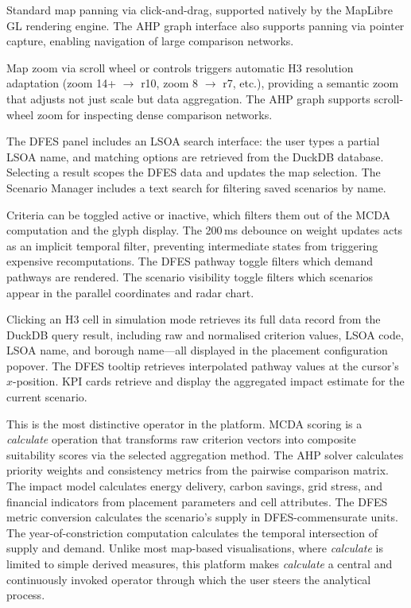 \begin{description}[nosep, leftmargin=0pt, itemindent=0pt]
    \item[Pan.] Standard map panning via click-and-drag, supported natively by the MapLibre GL rendering engine. The AHP graph interface also supports panning via pointer capture, enabling navigation of large comparison networks.

    \item[Zoom.] Map zoom via scroll wheel or controls triggers automatic H3 resolution adaptation (zoom 14+ $\rightarrow$ r10, zoom 8 $\rightarrow$ r7, etc.), providing a semantic zoom that adjusts not just scale but data aggregation. The AHP graph supports scroll-wheel zoom for inspecting dense comparison networks.

    \item[Search.] The DFES panel includes an LSOA search interface: the user types a partial LSOA name, and matching options are retrieved from the DuckDB database. Selecting a result scopes the DFES data and updates the map selection. The Scenario Manager includes a text search for filtering saved scenarios by name.

    \item[Filter.] Criteria can be toggled active or inactive, which filters them out of the MCDA computation and the glyph display. The 200\,ms debounce on weight updates acts as an implicit temporal filter, preventing intermediate states from triggering expensive recomputations. The DFES pathway toggle filters which demand pathways are rendered. The scenario visibility toggle filters which scenarios appear in the parallel coordinates and radar chart.

    \item[Retrieve.] Clicking an H3 cell in simulation mode retrieves its full data record from the DuckDB query result, including raw and normalised criterion values, LSOA code, LSOA name, and borough name—all displayed in the placement configuration popover. The DFES tooltip retrieves interpolated pathway values at the cursor's $x$-position. KPI cards retrieve and display the aggregated impact estimate for the current scenario.

    \item[Calculate.] This is the most distinctive operator in the platform. MCDA scoring is a \emph{calculate} operation that transforms raw criterion vectors into composite suitability scores via the selected aggregation method. The AHP solver calculates priority weights and consistency metrics from the pairwise comparison matrix. The impact model calculates energy delivery, carbon savings, grid stress, and financial indicators from placement parameters and cell attributes. The DFES metric conversion calculates the scenario's supply in DFES-commensurate units. The year-of-constriction computation calculates the temporal intersection of supply and demand. Unlike most map-based visualisations, where \emph{calculate} is limited to simple derived measures, this platform makes \emph{calculate} a central and continuously invoked operator through which the user steers the analytical process.
\end{description}

